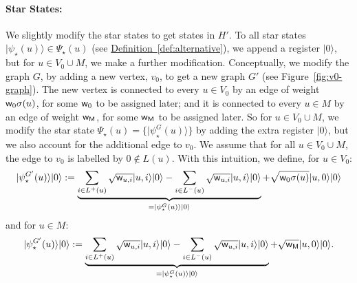 \documentclass{theoretics}
\newcommand{\defin}[1]{\hyperref[def:#1]{Definition~\ref*{def:#1}}}
\def\ket#1{{\lvert}#1\rangle}
\renewcommand{\>}{\rangle}
\newcommand{\<}{\langle}
\renewcommand{\(}{\left(}
\renewcommand{\)}{\right)}
\def\w{{\sf w}}
\begin{document}
\paragraph{Star States:} We slightly modify the star states to get states in $H'$. To all star states $\ket{\psi_\star(u)}\in \Psi_\star(u)$ (see \defin{alternative}), we append a register $\ket{0}$, but for $u\in V_0\cup M$, we make a further modification. 
Conceptually, we modify the graph $G$, by adding a new vertex, $v_0$, to get a new graph $G'$ (see Figure~\ref{fig:v0-graph}). The new vertex is connected to every $u\in V_0$ by an edge of weight $\w_0\sigma(u)$, for some $\w_0$ to be assigned later; and it is connected to every $u\in M$ by an edge of weight $\w_{\sf M}$, for some $\w_{\sf M}$ to be assigned later.  So for $u\in V_0\cup M$, we modify the star state $\Psi_\star(u)=\{\ket{\psi_\star^G(u)}\}$ by adding the extra register $\ket{0}$, but we also account for the additional edge to $v_0$. We assume that for all $u\in V_0\cup M$, the edge to $v_0$ is labelled by $0\not\in L(u)$. With this intuition, we define, for $u\in V_0$:
\begin{equation}
\ket{\psi_{\star}^{G'}(u)}\ket{0}:=\underbrace{
\sum_{i\in L^+(u)}\sqrt{\w_{u,i}}\ket{u,i}\ket{0} - \sum_{i\in L^-(u)}\sqrt{\w_{u,i}}\ket{u,i}\ket{0}  
}_{=\ket{\psi_\star^G(u)}\ket{0}}
+\sqrt{\w_0\sigma(u)}\ket{u,0}\ket{0}\label{eq:psi-star-F-1}
\end{equation}
and for $u\in M$:
\begin{equation}
\ket{\psi_{\star}^{G'}(u)}\ket{0}:=\underbrace{
\sum_{i\in L^+(u)}\sqrt{\w_{u,i}}\ket{u,i}\ket{0} - \sum_{i\in L^-(u)}\sqrt{\w_{u,i}}\ket{u,i}\ket{0}  
}_{=\ket{\psi_\star^G(u)}\ket{0}}
+\sqrt{\w_{\sf M}}\ket{u,0}\ket{0}.\label{eq:psi-star-F-M}
\end{equation}
\end{document}

